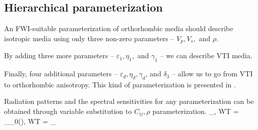 \subsection{Hierarchical parameterization}

An FWI-suitable parameterization of orthorhombic media should describe isotropic media using only three non-zero parameters -- $V_p,V_s,$ and $\rho$. 

By adding three more parameters -- $\varepsilon_1, \eta_1,$ and $\gamma_1$ -- we can describe VTI media.

Finally, four additional parameters -- $\varepsilon_d, \eta_d, \gamma_d$, and $\delta_3$ -- allow us to go from VTI to orthorhombic anisotropy. This kind of parameterization is presented in \cite{juwon2016}.


Radiation patterns and the spectral sensitivities for any parameterization can be obtained through variable substitution to $C_{ij},\rho$ parameterization. 
\beq \label{eq:JacoCij}
\bm{\Rp}_{\mv, WT} = \bm{\Rp}_{\mv_0(\mv), WT} = \bm{\Rp}_{\mv}
\eeq

